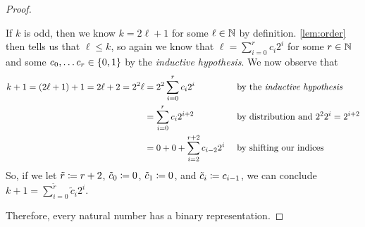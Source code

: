 \begin{proof}
\begin{case}
        \begin{case}[Case 2]
            If $k$ is odd, then we know $k = 2 \ell + 1$ for some $\ell \in \mathbb{N}$ by definition.
            \autoref{lem:order} then tells us that $\ell \leq k$,
            so again we know that $\ell = \sum_{i = 0}^{r}c_i 2^i$
            for some $r \in \mathbb{N}$ and some $c_0, \dots c_r \in \set*{0, 1}$
            by the \emph{inductive hypothesis}.
            We now observe that
            \begin{alignat*}{2}
                k + 1 = \pn*{2\ell + 1} + 1 = 2\ell + 2 = 2^2 \ell
                      &= 2^2 \sum_{i = 0}^{r}c_i 2^i &&\text{ by the \emph{inductive hypothesis}}\\
                      &= \sum_{i = 0}^{r}c_i 2^{i + 2} &&\text{ by distribution and } 2^2 2^i = 2^{i + 2}\\
                      &= 0 + 0 + \sum_{i = 2}^{r + 2}c_{i - 2}2^i &&\text{ by shifting our indices}
            \end{alignat*}
            So, if we let $\tilde{r} \coloneqq r + 2$, $\tilde{c}_0 \coloneqq 0$, $\tilde{c}_1 \coloneqq 0$, and $\tilde{c}_i \coloneqq c_{i - 1}$,
            we can conclude $k + 1 = \sum_{i = 0}^{\tilde{r}}\tilde{c}_i 2^i$.
        \end{case}
    \end{case}
    Therefore, every natural number has a binary representation.
\end{proof}


